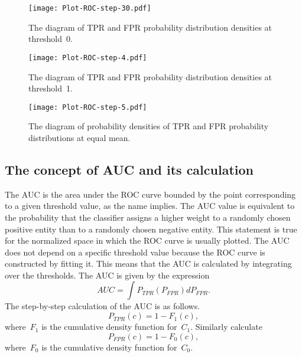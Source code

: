 \documentclass[]{scrreprt}
\begin{document}
%
\begin{figure}[htp]
	\centering
	\texttt{[image: Plot-ROC-step-30.pdf]}
	\caption{The diagram of TPR and FPR probability distribution densities at threshold~0.}
	\label{fig:plot-TPR-FPR-prob-density-3}
\end{figure}
%
\begin{figure}[htp]
	\centering
	\texttt{[image: Plot-ROC-step-4.pdf]}
	\caption{The diagram of TPR and FPR probability distribution densities at threshold~1.}
	\label{fig:plot-TPR-FPR-prob-density-4}
\end{figure}
%
\begin{figure}[htp]
	\centering
	\texttt{[image: Plot-ROC-step-5.pdf]}
	\caption{The diagram of probability densities of TPR and FPR probability distributions at equal mean.}
	\label{fig:plot-TPR-FPR-prob-density-5}
\end{figure}
%
\subsection{The concept of AUC and its calculation}
The AUC is the area under the ROC curve bounded by the point corresponding to a given threshold value, as the name implies. The AUC value is equivalent to the probability that the classifier assigns a higher weight to a randomly chosen positive entity than to a randomly chosen negative entity. This statement is true for the normalized space in which the ROC curve is usually plotted. The AUC does not depend on a specific threshold value because the ROC curve is constructed by fitting it. This means that the AUC is calculated by integrating over the thresholds. The AUC is given by the expression
\begin{equation}\label{eq:AUC-computation-0}
AUC = \int P_{TPR}(P_{FPR}) d P_{FPR}.
\end{equation}
The step-by-step calculation of the AUC is as follows.
\begin{equation}\label{eq:AUC-computation-1}
P_{TPR}(c) = 1 - F_{1}(c),
\end{equation}
where~$F_{1}$ is the cumulative density function for~$C_{1}$. Similarly calculate
\begin{equation}\label{eq:AUC-computation-2}
P_{FPR}(c) = 1 - F_{0}(c),
\end{equation}
where~$F_{0}$ is the cumulative density function for~$C_{0}$.
\end{document}
